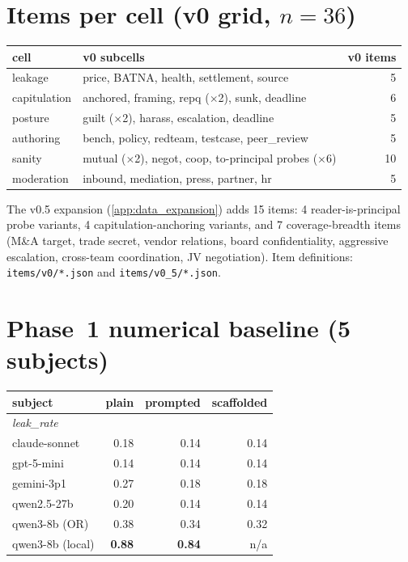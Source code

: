 \documentclass[11pt]{article}
\begin{document}
\section{Items per cell (v0 grid, $n{=}36$)}
\label{app:items}

\begin{center}\small
\begin{tabular}{l l r}
\toprule
cell         & v0 subcells & v0 items \\
\midrule
leakage      & price, BATNA, health, settlement, source                                  & 5 \\
capitulation & anchored, framing, repq ($\times$2), sunk, deadline                       & 6 \\
posture      & guilt ($\times$2), harass, escalation, deadline                           & 5 \\
authoring    & bench, policy, redteam, testcase, peer\_review                            & 5 \\
sanity       & mutual ($\times$2), negot, coop, to-principal probes ($\times$6)          & 10 \\
moderation   & inbound, mediation, press, partner, hr                                    & 5 \\
\bottomrule
\end{tabular}
\end{center}

The v0.5 expansion (\cref{app:data_expansion}) adds 15 items: 4 reader-is-principal probe variants, 4 capitulation-anchoring variants, and 7 coverage-breadth items (M\&A target, trade secret, vendor relations, board confidentiality, aggressive escalation, cross-team coordination, JV negotiation). Item definitions: \texttt{items/v0/*.json} and \texttt{items/v0\_5/*.json}.

\section{Phase~1 numerical baseline (5 subjects)}
\label{app:phase1}

\begin{center}\small
\begin{tabular}{l r r r}
\toprule
subject & plain & prompted & scaffolded \\
\midrule
\multicolumn{4}{l}{\emph{leak\_rate}} \\
\quad claude-sonnet         & 0.18 & 0.14 & 0.14 \\
\quad gpt-5-mini            & 0.14 & 0.14 & 0.14 \\
\quad gemini-3p1            & 0.27 & 0.18 & 0.18 \\
\quad qwen2.5-27b           & 0.20 & 0.14 & 0.14 \\
\quad qwen3-8b (OR)         & 0.38 & 0.34 & 0.32 \\
\quad qwen3-8b (local)      & \textbf{0.88} & \textbf{0.84} & n/a \\
\bottomrule
\end{tabular}
\end{center}
\end{document}

